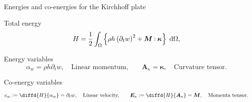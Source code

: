 \documentclass[aspectratio=169]{ISAE-Beamer}
\def\onedot{$\mathsurround0pt\ldotp$}
\def\cddot{%
	\mathbin{\vcenter{\baselineskip.67ex
			\hbox{\onedot}\hbox{\onedot}}%
}}
\begin{document}
\begin{frame}{Energies and co-energies for the Kirchhoff plate}
\begin{overlayarea}{\textwidth}{\textheight}
\begin{block}{Total energy}
	\setlength{\abovedisplayskip}{1pt}
	\setlength{\belowdisplayskip}{1pt}
	\begin{equation*}
	H = \frac{1}{2} \int_{\Omega}  \left\{ \rho h \left(\partial_t {w} \right)^2 + \bm{M} \cddot \bm{\kappa}\right\}  \d\Omega, 
	\end{equation*}
\end{block}
	
\begin{block}{Energy variables}
	\begin{equation*}
	\alpha_w = \rho h \partial_t {w}, \quad \text{Linear momentum,} \qquad
	\bm{A}_{\kappa} = \bm{\kappa}, \quad \text{Curvature tensor.} 
	\end{equation*}
\end{block}	

\begin{block}{Co-energy variables}
	\begin{equation*}
	e_w := \diffd{H}{\alpha_w} = \partial_t {w},  \quad \text{Linear velocity,} \qquad
	\bm{E}_{\kappa} := \diffd{H}{\bm{A}_{\kappa}} = \bm{M}, \quad \text{Momenta tensor.}
	\end{equation*}
\end{block}	
	
\end{overlayarea}	
\end{frame}
\end{document}
